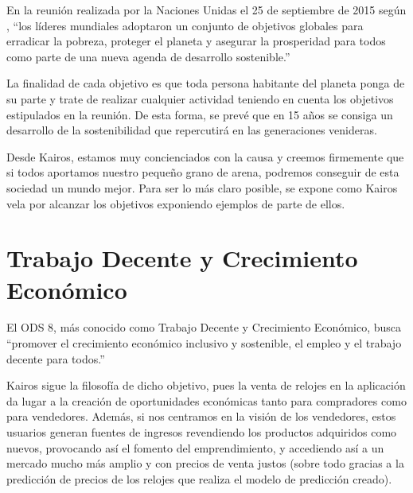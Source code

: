 
%
%

	En la reunión realizada por la Naciones Unidas el 25 de septiembre de 2015 según \cite{ods}, ``los líderes mundiales adoptaron un conjunto de objetivos globales para erradicar la pobreza, proteger el planeta y asegurar la prosperidad para todos como parte de una nueva agenda de desarrollo sostenible.''
	
	La finalidad de cada objetivo es que toda persona habitante del planeta ponga de su parte y trate de realizar cualquier actividad teniendo en cuenta los objetivos estipulados en la reunión. De esta forma, se prevé que en 15 años se consiga un desarrollo de la sostenibilidad que repercutirá en las generaciones venideras.
	
	Desde Kairos, estamos muy concienciados con la causa y creemos firmemente que si todos aportamos nuestro pequeño grano de arena, podremos conseguir de esta sociedad un mundo mejor. Para ser lo más claro posible, se expone como Kairos vela por alcanzar los objetivos exponiendo ejemplos de parte de ellos.
	
\section{Trabajo Decente y Crecimiento Económico}

	El ODS 8, más conocido como Trabajo Decente y Crecimiento Económico, busca ``promover el crecimiento económico inclusivo y sostenible, el empleo y el trabajo decente para todos.''
	
	Kairos sigue la filosofía de dicho objetivo, pues la venta de relojes en la aplicación da lugar a la creación de oportunidades económicas tanto para compradores como para vendedores. Además, si nos centramos en la visión de los vendedores, estos usuarios generan fuentes de ingresos revendiendo los productos adquiridos como nuevos, provocando así el fomento del emprendimiento, y accediendo así a un mercado mucho más amplio y con precios de venta justos (sobre todo gracias a la predicción de precios de los relojes que realiza el modelo de predicción creado).
	

